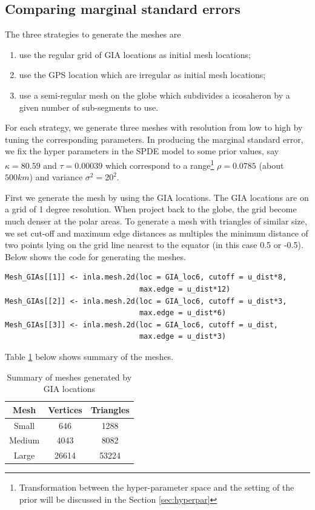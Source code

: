 \documentclass[a4paper,12pt]{article}
\begin{document}
\subsection{Comparing marginal standard errors}
The three strategies to generate the meshes are
\begin{enumerate}
\item use the regular grid of GIA locations as initial mesh locations;
\item use the GPS location which are irregular as initial mesh locations;
\item use a semi-regular mesh on the globe which subdivides a icosaheron by a given number of sub-segments to use.
\end{enumerate}

For each strategy, we generate three meshes with resolution from low to high by tuning the corresponding parameters. In producing the marginal standard error, we fix the hyper parameters in the SPDE model to some prior values, say $\kappa = 80.59$ and $\tau = 0.00039$ which correspond to a range\footnote{Transformation between the hyper-parameter space and the setting of the prior will be discussed in the Section \ref{sec:hyperpar}} $\rho = 0.0785$ (about $500km$) and variance $\sigma^2 = 20^2$.

First we generate the mesh by using the GIA locations. The GIA locations are on a grid of 1 degree resolution. When project back to the globe, the grid become much denser at the polar areas. To generate a mesh with triangles of similar size, we set cut-off and maximum edge distances as multiples the minimum distance of two points lying on the grid line nearest to the equator (in this case 0.5 or -0.5). Below shows the code for generating the meshes.
\begin{verbatim}
Mesh_GIAs[[1]] <- inla.mesh.2d(loc = GIA_loc6, cutoff = u_dist*8, 
                               max.edge = u_dist*12) 
Mesh_GIAs[[2]] <- inla.mesh.2d(loc = GIA_loc6, cutoff = u_dist*3, 
                               max.edge = u_dist*6) 
Mesh_GIAs[[3]] <- inla.mesh.2d(loc = GIA_loc6, cutoff = u_dist, 
                               max.edge = u_dist*3)
\end{verbatim}

Table \ref{tab:GIA_mesh} below shows summary of the meshes.

\begin{table}[htbp] 
\centering
\caption{Summary of meshes generated by GIA locations}\label{tab:GIA_mesh}
\begin{tabular}{ c| c c }
\hline
 Mesh     & Vertices & Triangles \\\hline
 Small  &  646 & 1288 \\ 
 Medium & 4043 & 8082 \\  
 Large  & 26614 & 53224 \\   \hline
\end{tabular}
\end{table}
\end{document}
